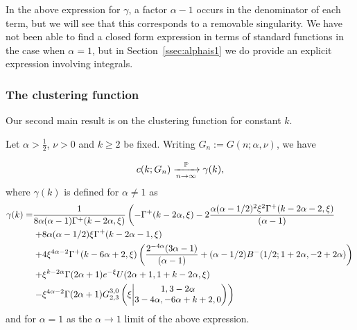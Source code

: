 In the above expression for $\gamma$, a factor $\alpha-1$ occurs in the denominator of each term, but we will see that this
corresponds to a removable singularity. We have not been able to find a closed form expression in terms of standard functions in the case 
when $\alpha=1$, but in Section~\ref{ssec:alphais1} we do provide an explicit expression involving integrals.


\subsubsection{The clustering function}

Our second main result is on the clustering function for constant $k$.

\begin{theorem}\label{thm:local_clustering_hyperbolic}\label{thm:mainkfixed}
Let $\alpha > \frac{1}{2}$, $\nu > 0$ and $k\geq2$ be fixed. 
Writing $G_n := G(n;\alpha,\nu)$, we have

\[
	c(k;G_n) \xrightarrow[n\to\infty]{\Pee} \gamma(k),
\]
where $\gamma(k)$ is defined for $\alpha \ne 1$ as 
\begin{align*}
\gamma(k)  =&\frac{1}{8\alpha (\alpha-1)\Gamma^+(k-2\alpha,\xi)} \left( -\Gamma^+(k - 2 \alpha, \xi) - 2\frac{\alpha (\alpha - 1/2)^2 \xi^{2} \Gamma^+(k - 2 \alpha - 2, \xi)}{(\alpha - 1)} \right. \\ 
&\left.+ 8 \alpha (\alpha - 1/2) \xi \Gamma^+(k - 2 \alpha - 1,\xi) \right.\\ 
&\left.+ 4\xi^{4\alpha - 2} \Gamma^+(k - 6 \alpha + 2, 
      \xi) \left( \frac{2^{ - 4\alpha}(3 \alpha - 1)}{(\alpha - 1)} + (\alpha - 1/2) B^-(1/2; 1 + 2 \alpha, -2 + 2 \alpha) \right)  \right.\\ 
&\left.+ \xi^{k-2\alpha} \Gamma(2\alpha+1)e^{-\xi} U(2\alpha+1,1+k-2\alpha,\xi) \right. \\ 
&\left.- \xi^{4\alpha-2} \Gamma(2\alpha+1)\MeijerGnew{3}{0}{2}{3}{1,3-2\alpha}{3-4\alpha,-6\alpha+k+2,0}{\xi}  \right)
\end{align*}
and for $\alpha = 1$ as the $\alpha\to1$ limit of the above expression.
\end{theorem}


